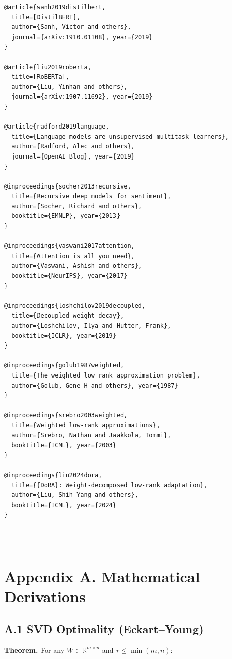\begin{lstlisting}
@article{sanh2019distilbert,
  title=[DistilBERT],
  author={Sanh, Victor and others},
  journal={arXiv:1910.01108}, year={2019}
}

@article{liu2019roberta,
  title=[RoBERTa],
  author={Liu, Yinhan and others},
  journal={arXiv:1907.11692}, year={2019}
}

@article{radford2019language,
  title={Language models are unsupervised multitask learners},
  author={Radford, Alec and others},
  journal={OpenAI Blog}, year={2019}
}

@inproceedings{socher2013recursive,
  title={Recursive deep models for sentiment},
  author={Socher, Richard and others},
  booktitle={EMNLP}, year={2013}
}

@inproceedings{vaswani2017attention,
  title={Attention is all you need},
  author={Vaswani, Ashish and others},
  booktitle={NeurIPS}, year={2017}
}

@inproceedings{loshchilov2019decoupled,
  title={Decoupled weight decay},
  author={Loshchilov, Ilya and Hutter, Frank},
  booktitle={ICLR}, year={2019}
}

@inproceedings{golub1987weighted,
  title={The weighted low rank approximation problem},
  author={Golub, Gene H and others}, year={1987}
}

@inproceedings{srebro2003weighted,
  title={Weighted low-rank approximations},
  author={Srebro, Nathan and Jaakkola, Tommi},
  booktitle={ICML}, year={2003}
}

@inproceedings{liu2024dora,
  title={{DoRA}: Weight-decomposed low-rank adaptation},
  author={Liu, Shih-Yang and others},
  booktitle={ICML}, year={2024}
}
\end{lstlisting}
\begin{lstlisting}

---
\end{lstlisting}


\section{Appendix A. Mathematical Derivations}

\subsection{A.1 SVD Optimality (Eckart--Young)}

\textbf{Theorem.} For any $W \in \mathbb{R}^{m \times n}$ and $r \leq \min(m, n)$:

